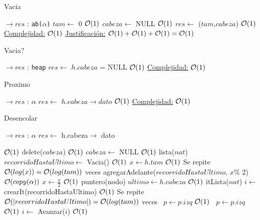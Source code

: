 \begin{Algoritmos}



\begin{algorithm}
\caption{Vacia}
\begin{algorithmic}[1]
   $\to res$ : \texttt{ab($\alpha$)}
  \State $tam \gets$ 0 \Comment $\mathcal{O}(1)$
  \State $cabeza \gets$ NULL \Comment $\mathcal{O}(1)$
  \State $res \gets$ ($tam$,$cabeza$) \Comment $\mathcal{O}(1)$
 \EndProcedure
 \underline{Complejidad:} $\mathcal{O}(1)$
 \underline{Justificación:} $\mathcal{O}(1)+\mathcal{O}(1)+\mathcal{O}(1) = \mathcal{O}(1)$
\end{algorithmic}
\end{algorithm}


\begin{algorithm}
\caption{Vacia?}
\begin{algorithmic}[1]
   $\to res$ : \texttt{heap}
  \State $res \gets$ $h.cabeza$ = NULL \Comment $\mathcal{O}(1)$ 
 \EndProcedure
 \underline{Complejidad:} $\mathcal{O}(1)$
\end{algorithmic}
\end{algorithm}


\begin{algorithm}
\caption{Proximo}
\begin{algorithmic}[1]
   $\to res$ : $\alpha$
  \State $res \gets$ $h.cabeza \to dato$ \Comment $\mathcal{O}(1)$ 
 \EndProcedure
 \underline{Complejidad:} $\mathcal{O}(1)$
\end{algorithmic}
\end{algorithm}



\begin{algorithm}
\caption{Desencolar}
\begin{algorithmic}[1]
   $\to res$ : $\alpha$
  \State $res \gets$ h.cabeza$\to$ dato

   \Comment $\mathcal{O}(1)$
    \State delete($cabeza$) \Comment $\mathcal{O}(1)$
    \State $cabeza \gets$ NULL \Comment $\mathcal{O}(1)$
  \Else
    \State lista($nat$) $recorridoHastaUltimo \gets$ Vacia() \Comment $\mathcal{O}(1)$
    \State $x \gets h.tam$ \Comment $\mathcal{O}(1)$
     \Comment Se repite $\mathcal{O}(log(x)) = \mathcal{O}(log(tam))$ veces
      \State agregarAdelante($recorridoHastaUltimo$, $x$\% 2) \Comment $\mathcal{O}(copy(\alpha))$
      \State $x \gets \frac{x}{2}$ \Comment $\mathcal{O}(1)$
    \EndWhile
    \State puntero(nodo) $ultimo \gets h.cabeza$ \Comment $\mathcal{O}(1)$
    \State itLista($nat$) $i \gets$ crearIt(recorridoHastaUltimo) \Comment $\mathcal{O}(1)$
      \Comment Se repite $\mathcal{O}(|recorridoHastaUltimo|) = \mathcal{O}(log(tam))$ veces
       \ $p \gets p.izq$ \Comment $\mathcal{O}(1)$
      \Else \  $p \gets p.izq$ \Comment $\mathcal{O}(1)$
      \EndIf
      \State $i \gets$ Avanzar($i$) \Comment $\mathcal{O}(1)$
    \EndWhile
    

\end{algorithmic}
\end{algorithm}
\end{Algoritmos}
